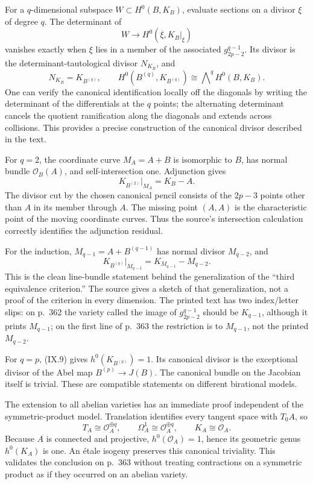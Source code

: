 For a \(q\)-dimensional subspace \(W\subset H^0(B,K_B)\), evaluate sections on a divisor \(\xi\) of degree \(q\). The determinant of
\[
W\longrightarrow H^0(\xi,K_B\vert _\xi)
\]
vanishes exactly when \(\xi\) lies in a member of the associated \(g^{q-1}_{2p-2}\). Its divisor is the determinant-tautological divisor \(N_{K_B}\), and
\begin{equation*}\label{cp2-ix-eq9}
N_{K_B}=K_{B^{(q)}},\qquad
H^0(B^{(q)},K_{B^{(q)}})\cong\bigwedge\nolimits^qH^0(B,K_B).
\tag{IX.9}
\end{equation*}
One can verify the canonical identification locally off the diagonals by writing the determinant of the differentials at the \(q\) points; the alternating determinant cancels the quotient ramification along the diagonals and extends across collisions. This provides a precise construction of the canonical divisor described in the text.

For \(q=2\), the coordinate curve \(M_A=A+B\) is isomorphic to \(B\), has normal bundle \(\mathcal O_B(A)\), and self-intersection one. Adjunction gives
\[
K_{B^{(2)}}\vert _{M_A}=K_B-A.
\]
The divisor cut by the chosen canonical pencil consists of the \(2p-3\) points other than \(A\) in its member through \(A\). The missing point \((A,A)\) is the characteristic point of the moving coordinate curves. Thus the source's intersection calculation correctly identifies the adjunction residual.

For the induction, \(M_{q-1}=A+B^{(q-1)}\) has normal divisor \(M_{q-2}\), and
\[
K_{B^{(q)}}\vert _{M_{q-1}}=K_{M_{q-1}}-M_{q-2}.
\]
This is the clean line-bundle statement behind the generalization of the ``third equivalence criterion.'' The source gives a sketch of that generalization, not a proof of the criterion in every dimension. The printed text has two index/letter slips: on p.~362 the variety called the image of \(g^{q-1}_{2p-2}\) should be \(K_{q-1}\), although it prints \(M_{q-1}\); on the first line of p.~363 the restriction is to \(M_{q-1}\), not the printed \(M_{q-2}\).

For \(q=p\), (IX.9) gives \(h^0(K_{B^{(p)}})=1\). Its canonical divisor is the exceptional divisor of the Abel map \(B^{(p)}\to J(B)\). The canonical bundle on the Jacobian itself is trivial. These are compatible statements on different birational models.

The extension to all abelian varieties has an immediate proof independent of the symmetric-product model. Translation identifies every tangent space with \(T_0A\), so
\[
T_A\cong\mathcal O_A^{\oplus q},\qquad
\Omega_A^1\cong\mathcal O_A^{\oplus q},\qquad
K_A\cong\mathcal O_A.
\]
Because \(A\) is connected and projective, \(h^0(\mathcal O_A)=1\), hence its geometric genus \(h^0(K_A)\) is one. An étale isogeny preserves this canonical triviality. This validates the conclusion on p.~363 without treating contractions on a symmetric product as if they occurred on an abelian variety.

